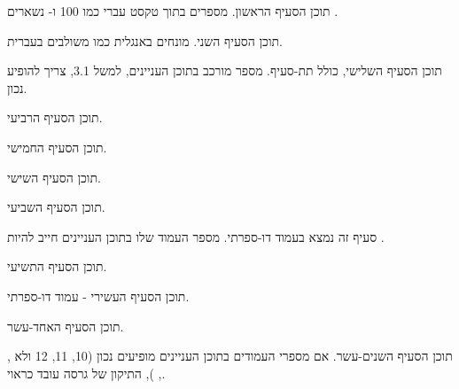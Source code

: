 \documentclass{hebrew-academic-template}   %
\date{\textenglish{June 2026}}
\begin{document}
\maketitle
\tableofcontents
\newpage


תוכן הסעיף הראשון. מספרים בתוך טקסט עברי כמו \num{100} ו- נשארים .
\newpage

תוכן הסעיף השני. מונחים באנגלית כמו  משולבים בעברית.
\newpage

תוכן הסעיף השלישי, כולל תת-סעיף.
מספר מורכב בתוכן העניינים, למשל \num{3.1}, צריך להופיע נכון.
\newpage

תוכן הסעיף הרביעי.
\newpage

תוכן הסעיף החמישי.
\newpage

תוכן הסעיף השישי.
\newpage

תוכן הסעיף השביעי.
\newpage

סעיף זה נמצא בעמוד דו-ספרתי. מספר העמוד שלו בתוכן העניינים חייב להיות .
\newpage

תוכן הסעיף התשיעי.
\newpage

תוכן הסעיף העשירי - עמוד דו-ספרתי.
\newpage

תוכן הסעיף האחד-עשר.
\newpage

תוכן הסעיף השנים-עשר. אם מספרי העמודים בתוכן העניינים מופיעים נכון
(\num{10}, \num{11}, \num{12} ולא , , ), התיקון של גרסה
 עובד כראוי.
\end{document}
